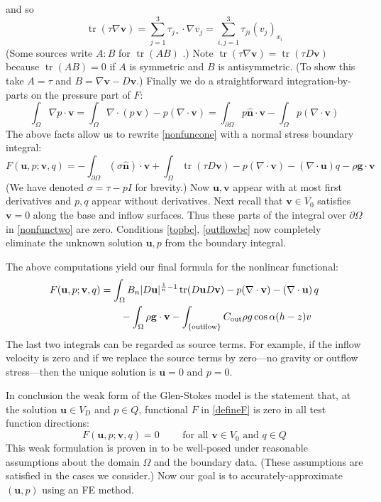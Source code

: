 \documentclass[letterpaper,final,12pt,reqno]{amsart}
\newcommand{\grad}{\nabla}
\newcommand{\trace}{\operatorname{tr}}
\newcommand{\hbn}{\hat{\mathbf{n}}}
\newcommand{\bu}{\mathbf{u}}
\newcommand{\bv}{\mathbf{v}}
\begin{document}
and so
    $$\trace(\tau \grad \bv) = \sum_{j=1}^3 \tau_{j\circ} \cdot \grad v_j = \sum_{i,j=1}^3 \tau_{ji} (v_j)_{x_i}$$
(Some sources write $A:B$ for $\trace(AB)$ \cite{JouvetRappaz2011}.)  Note $\trace(\tau \grad \bv) = \trace(\tau D\bv)$ because $\trace(AB)=0$ if $A$ is symmetric and $B$ is antisymmetric.  (To show this take $A=\tau$ and $B=\grad\bv-D\bv$.)  Finally we do a straightforward integration-by-parts on the pressure part of $F$:
    $$\int_\Omega \nabla p \cdot \bv = \int_\Omega \nabla\cdot (p\,\bv) - p (\nabla \cdot \bv) = \int_{\partial \Omega} p\hbn \cdot \bv - \int_\Omega p (\nabla \cdot \bv)$$
The above facts allow us to rewrite \eqref{nonfuncone} with a normal stress boundary integral:
\begin{equation}
F(\bu,p;\bv,q) = -\int_{\partial\Omega} (\sigma \hbn)\cdot \bv + \int_\Omega \trace(\tau D\bv) - p (\nabla \cdot \bv) - \left(\nabla \cdot \bu\right) q - \rho \mathbf{g} \cdot \bv \label{nonfunctwo}
\end{equation}
(We have denoted $\sigma=\tau-pI$ for brevity.)  Now $\bu,\bv$ appear with at most first derivatives and $p,q$ appear without derivatives.  Next recall that $\bv\in V_0$ satisfies $\bv=0$ along the base and inflow surfaces.  Thus these parts of the integral over $\partial\Omega$ in \eqref{nonfunctwo} are zero.  Conditions \eqref{topbc}, \eqref{outflowbc} now completely eliminate the unknown solution $\bu,p$ from the boundary integral.

The above computations yield our final formula for the nonlinear functional:
\begin{align}
F(\bu,p;\bv,q) &= \int_\Omega B_n |D\bu|^{\frac{1}{n} - 1} \trace(D\bu D\bv) - p (\nabla \cdot \bv) - \left(\nabla \cdot \bu\right) q \label{defineF} \\
    &\qquad  - \int_\Omega \rho \mathbf{g} \cdot \bv - \int_{\{\text{outflow}\}} C_{\text{out}} \rho g \cos\alpha (h-z) v  \notag
\end{align}
The last two integrals can be regarded as source terms.  For example, if the inflow velocity is zero and if we replace the source terms by zero---no gravity or outflow stress---then the unique solution is $\bu=0$ and $p=0$.

In conclusion the weak form of the Glen-Stokes model is the statement that, at the solution $\bu\in V_D$ and $p\in Q$, functional $F$ in \eqref{defineF} is zero in all test function directions:
\begin{equation}
F(\bu,p;\bv,q) = 0 \qquad \text{ for all } \bv\in V_0 \text{ and } q\in Q  \label{weak}
\end{equation}
This weak formulation is proven in \cite[Theorem 3.8]{JouvetRappaz2011} to be well-posed under reasonable assumptions about the domain $\Omega$ and the boundary data.  (These assumptions are satisfied in the cases we consider.)  Now our goal is to accurately-approximate $(\bu,p)$ using an FE method.
\end{document}
